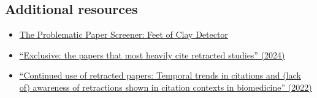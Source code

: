 \documentclass[letterpaper, 12pt]{article}
\begin{document}

\subsection*{Additional resources}

\begin{itemize}
    \setlength\itemsep{-0.5em}
    \item \href{https://dbrech.irit.fr/pls/apex/f?p=9999:31::::::}{The Problematic Paper Screener: Feet of Clay Detector}
    \item \href{https://doi.org/10.1378/chest.11-0523}{``Exclusive: the papers that most heavily cite retracted studies'' (2024)}
    \item \href{https://direct.mit.edu/qss/article/2/4/1144/107356/Continued-use-of-retracted-papers-Temporal-trends}{``Continued use of retracted papers: Temporal trends in citations and (lack of) awareness of retractions shown in citation contexts in biomedicine'' (2022)}
\end{itemize}
\end{document}
